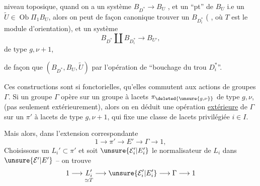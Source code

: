   niveau toposique, quand on a un système \(B_{D^*}\longrightarrow B_U\) , et un ``pt'' de \(B_U\) i.e un \(\widetilde U\in\operatorname{Ob}\Pi_1B_U\), alors on peut de façon canonique trouver un \(B_{D_i^*}\) ( , où \(T\) est le module d'orientation), et un système
\[
B_{D^*}\amalg B_{D_i^*}\longrightarrow B_{U'},
\]
de type \(g,\nu+1\),


de façon que \((B_{D^*},B_U,\widetilde U)\)  par l'opération de ``bouchage du trou \(D_i^*\)''.

Ces constructions sont si fonctorielles, \margin{\unsure{\(\wedge\)}} qu'elles commutent aux actions de groupes \(\Gamma\). Si un groupe \(\Gamma\) opère sur un groupe à lacets \(\pi_{\deleted{\unsure{g,\nu}}}\) de type \(g,\nu\), (pas seulement extérieurement), alors on en déduit une opération \uline{extérieure} de \(\Gamma\) sur un \(\pi'\) à lacets de type \(g,\nu+1\), qui fixe une classe de lacets privilégiée \(i\in I\).

Mais alors, dans l'extension correspondante
\[
1\longrightarrow\pi'\longrightarrow E'\longrightarrow\Gamma\longrightarrow1,
\]
Choisissons un \(L_i'\subset\pi'\) et soit \(\unsure{\mathcal E_i'|E_i'}\) le normalisateur de \(L_i\) dans \(\unsure{\mathcal E'|E'}\) -- on trouve
\[
1\longrightarrow
\underset{\simeq T}{L_i'}
\longrightarrow\unsure{\mathcal E_i'|E_i'}
\longrightarrow\Gamma\longrightarrow1
\]
